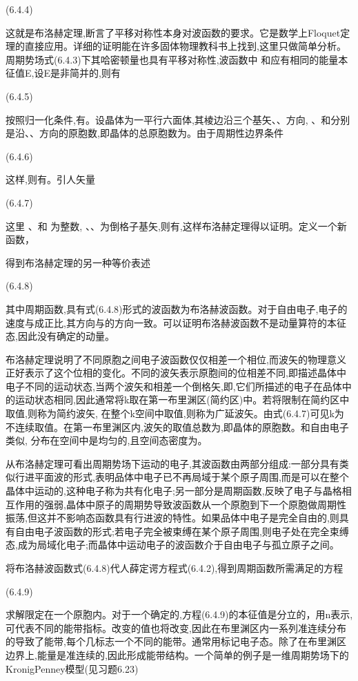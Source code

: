 	(6.4.4)

这就是布洛赫定理,断言了平移对称性本身对波函数的要求。它是数学上Floquet定理的直接应用。详细的证明能在许多固体物理教科书上找到,这里只做简单分析。周期势场式(6.4.3)下其哈密顿量也具有平移对称性,波函数中 和应有相同的能量本征值E,设E是非简并的,则有

 	(6.4.5)

按照归一化条件,有。设晶体为一平行六面体,其棱边沿三个基矢、、方向, 、和分别是沿、、方向的原胞数,即晶体的总原胞数为。由于周期性边界条件

	 (6.4.6)

这样,则有。引人矢量

 	(6.4.7)

这里 、和 为整数, 、、为倒格子基矢,则有,这样布洛赫定理得以证明。定义一个新函数，



得到布洛赫定理的另一种等价表述

 	(6.4.8)

其中周期函数,具有式(6.4.8)形式的波函数为布洛赫波函数。对于自由电子,电子的速度与成正比,其方向与的方向一致。可以证明布洛赫波函数不是动量算符的本征态,因此没有确定的动量。

布洛赫定理说明了不同原胞之间电子波函数仅仅相差一个相位,而波矢的物理意义正好表示了这个位相的变化。不同的波矢表示原胞间的位相差不同,即描述晶体中电子不同的运动状态,当两个波矢和相差一个倒格矢,即,它们所描述的电子在品体中的运动状态相同,因此通常将k取在第一布里渊区(简约区)中。若将限制在简约区中取值,则称为简约波矢, 在整个k空间中取值,则称为广延波矢。由式(6.4.7)可见k为不连续取值。在第一布里渊区内,波矢的取值总数为,即晶体的原胞数。和自由电子类似, 分布在空间中是均匀的,且空间态密度为。

从布洛赫定理可看出周期势场下运动的电子,其波函数由两部分组成:一部分具有类似行进平面波的形式,表明品体中电子已不再局域于某个原子周围,而是可以在整个晶体中运动的,这种电子称为共有化电子;另一部分是周期函数,反映了电子与晶格相互作用的强弱,晶体中原子的周期势导致波函数从一个原胞到下一个原胞做周期性振荡,但这并不影响态函数具有行进波的特性。如果品体中电子是完全自由的,则具有自由电子波函数的形式;若电子完全被束缚在某个原子周围,则电子处在完全束缚态,成为局域化电子;而晶体中运动电子的波函数介于自由电子与孤立原子之间。

将布洛赫波函数式(6.4.8)代人薛定谔方程式(6.4.2),得到周期函数所需满足的方程

 	(6.4.9)

求解限定在一个原胞内。对于一个确定的,方程(6.4.9)的本征值是分立的，用n表示,可代表不同的能带指标。改变的值也将改变,因此在布里渊区内一系列准连续分布的导致了能带,每个几标志一个不同的能带。通常用标记电子态。除了在布里渊区边界上,能量是准连续的,因此形成能带结构。一个简单的例子是一维周期势场下的KronigPenney模型(见习题6.23)

